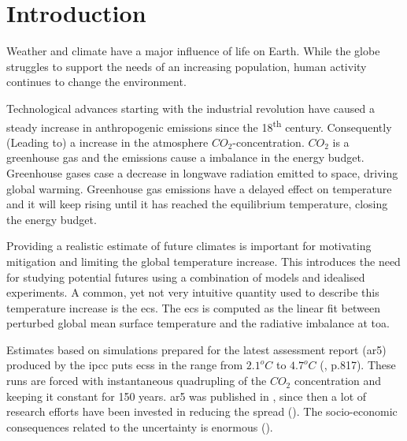 \chapter{Introduction} \label{ch:introduction}
Weather and climate have a major influence of life on Earth. While the globe struggles to support the needs of an increasing population, human activity continues to change the environment. %

Technological advances starting with the industrial revolution have caused a steady increase in anthropogenic emissions since the 18\textsuperscript{th} century. %
Consequently (Leading to) a increase in the atmosphere $CO_2$-concentration. $CO_2$ is a greenhouse gas and the emissions cause a imbalance in the energy budget. Greenhouse gases case a decrease in longwave radiation emitted to space, driving global warming.
Greenhouse gas emissions have a delayed effect on temperature and it will keep rising until it has reached the equilibrium temperature, closing the energy budget. 

Providing a realistic estimate of future climates is important for motivating mitigation and limiting the global temperature increase. 
This introduces the need for studying potential futures using a combination of models and idealised experiments. A common, yet not very intuitive quantity used to describe this temperature increase is the \acrfull{ecs}. The \acrshort{ecs} is computed as the linear fit between perturbed global mean surface temperature and the radiative imbalance at \acrfull{toa}. 

Estimates based on %
simulations prepared for the latest assessment report (\acrshort{ar5}) produced by the \acrfull{ipcc} puts \acrshort{ecs}s in the range from $2.1^oC$ to $4.7^oC$ (\cite{IPCC_CH9_climate_models}, p.817). These runs are forced with instantaneous quadrupling of the $CO_2$ concentration %
and keeping it constant for 150 years.  
\acrshort{ar5} was published in \citeyear{IPCC_entire_book}, since then a lot of research efforts have been invested in reducing the spread (\cite{Cox2018}). %
The socio-economic consequences related to the uncertainty is enormous (\cite{bony2015}). 

